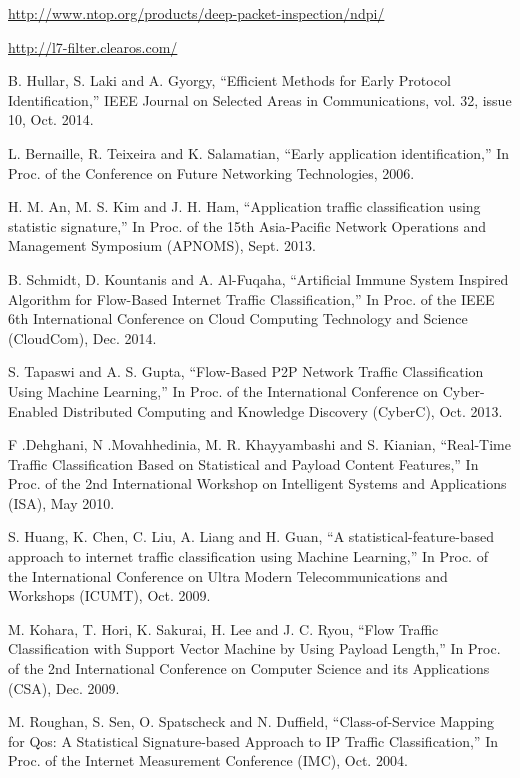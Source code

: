 \begin{thebibliography}{1}

\url{http://www.ntop.org/products/deep-packet-inspection/ndpi/}

\url{http://l7-filter.clearos.com/}

B. Hullar, S. Laki and A. Gyorgy,
``Efficient Methods for Early Protocol Identification,'' IEEE Journal on Selected Areas in Communications,  vol. 32, issue 10, Oct. 2014. 

L. Bernaille, R. Teixeira and K. Salamatian, 
``Early application identification,'' In Proc. of the Conference on Future Networking Technologies, 2006.

H. M. An, M. S. Kim and J. H. Ham,
``Application traffic classification using statistic signature,'' In Proc. of the 15th Asia-Pacific Network Operations and Management Symposium (APNOMS), Sept. 2013.

B. Schmidt, D. Kountanis and A. Al-Fuqaha, 
``Artificial Immune System Inspired Algorithm for Flow-Based Internet Traffic Classification,'' In Proc. of the IEEE 6th International Conference on Cloud Computing Technology and Science (CloudCom), Dec. 2014. 

S. Tapaswi and A. S. Gupta,
``Flow-Based P2P Network Traffic Classification Using Machine Learning,'' In Proc. of the International Conference on Cyber-Enabled Distributed Computing and Knowledge Discovery (CyberC), Oct. 2013. 

F .Dehghani, N .Movahhedinia, M. R. Khayyambashi and S. Kianian, 
``Real-Time Traffic Classification Based on Statistical and Payload Content Features,'' In Proc. of the 2nd International Workshop on Intelligent Systems and Applications (ISA), May 2010. 

S. Huang, K. Chen, C. Liu, A. Liang and H. Guan,
``A statistical-feature-based approach to internet traffic classification using Machine Learning,'' In Proc. of the International Conference on Ultra Modern Telecommunications and Workshops (ICUMT), Oct. 2009. 

M. Kohara, T. Hori, K. Sakurai, H. Lee and J. C. Ryou,
``Flow Traffic Classification with Support Vector Machine by Using Payload Length,'' In Proc. of the 2nd International Conference on Computer Science and its Applications (CSA), Dec. 2009.  

M. Roughan, S. Sen, O. Spatscheck and N. Duffield, 
``Class-of-Service Mapping for Qos: A Statistical Signature-based Approach to IP Traffic Classification,'' In Proc. of the Internet Measurement Conference (IMC), Oct. 2004.


\end{thebibliography}
